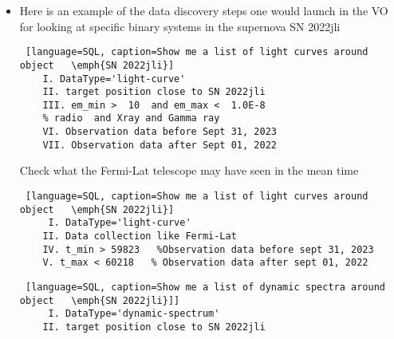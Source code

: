 \begin{itemize}
 \begin{lstlisting} [language=SQL, caption=Show me a list of all data products using a specified Time system ]
   Show me a list of all data products using a specified Time system  
    I. DataType='light-curve' or 'time-series'
    II. time scale=TDB
    III. time reference position=BARYCENTER 
  \end{lstlisting}
 
 TBC planet transit ? TESS ?? 
 
TBC binary stars ??
 
 \item  Here is an example of the data discovery steps one would launch in the VO for looking at specific binary systems 
 in the supernova SN 2022jli \citep{2024Natur.625..253C}
 
 \begin{lstlisting} [language=SQL, caption=Show me a list of light curves around object   \emph{SN 2022jli}]
    I. DataType='light-curve' 
    II. target position close to SN 2022jli
    III. em_min >  10  and em_max <  1.0E-8 
    % radio  and Xray and Gamma ray
    VI. Observation data before Sept 31, 2023
    VII. Observation data after Sept 01, 2022    
   \end{lstlisting}
   
  Check what the Fermi-Lat telescope may have seen in the mean time 
  \begin{lstlisting} [language=SQL, caption=Show me a list of light curves around object   \emph{SN 2022jli}]
     I. DataType='light-curve' 
    II. Data collection like Fermi-Lat 
    IV. t_min > 59823   %Observation data before sept 31, 2023
    V. t_max < 60218   % Observation data after sept 01, 2022
  \end{lstlisting}
  
   \begin{lstlisting} [language=SQL, caption=Show me a list of dynamic spectra around object   \emph{SN 2022jli}]]
     I. DataType='dynamic-spectrum'
    II. target position close to SN 2022jli
    \end{lstlisting} 
  
  \end{itemize}
